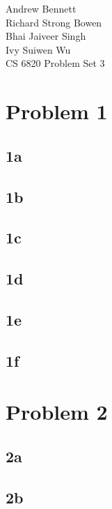 \documentclass{article}
\begin{document}
\begin{flushright}
Andrew Bennett\\
Richard Strong Bowen\\
Bhai Jaiveer Singh\\
Ivy Suiwen Wu\\
CS 6820 Problem Set 3
\end{flushright}
\section*{Problem 1}
\subsection*{1a}
\subsection*{1b}
\subsection*{1c}
\subsection*{1d}
\subsection*{1e}
\subsection*{1f}
\section*{Problem 2}
\subsection*{2a}
\subsection*{2b}
\end{document}
